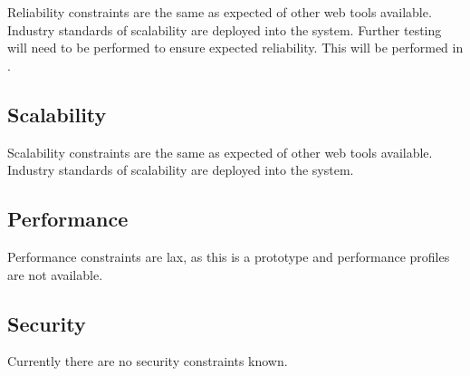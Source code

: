 \documentclass[11pt]{report}
\begin{document}
Reliability constraints are the same as expected of other web tools available. Industry standards of scalability are deployed into the system. Further testing will need to be performed to ensure expected reliability. This will be performed in .  

\subsection{Scalability}

Scalability constraints are the same as expected of other web tools available. Industry standards of scalability are deployed into the system. 

\subsection{Performance}

Performance constraints are lax, as this is a prototype and performance profiles are not available. 

\subsection{Security} 

Currently there are no security constraints known. 

{}
\end{document}
